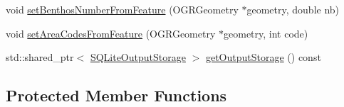 \begin{DoxyCompactItemize}
\item 
void \mbox{\hyperlink{class_displace_model_adc1346c16dbd6484cd9c7df6f5b102d8}{set\+Benthos\+Number\+From\+Feature}} (O\+G\+R\+Geometry $\ast$geometry, double nb)
\item 
void \mbox{\hyperlink{class_displace_model_af9650fb674f7d588fcb24d228bcdc834}{set\+Area\+Codes\+From\+Feature}} (O\+G\+R\+Geometry $\ast$geometry, int code)
\item 
std\+::shared\+\_\+ptr$<$ \mbox{\hyperlink{class_s_q_lite_output_storage}{S\+Q\+Lite\+Output\+Storage}} $>$ \mbox{\hyperlink{class_displace_model_a0ab79ebec2fcb009c6fe4373541afbc4}{get\+Output\+Storage}} () const
\end{DoxyCompactItemize}
\subsection*{Protected Member Functions}
